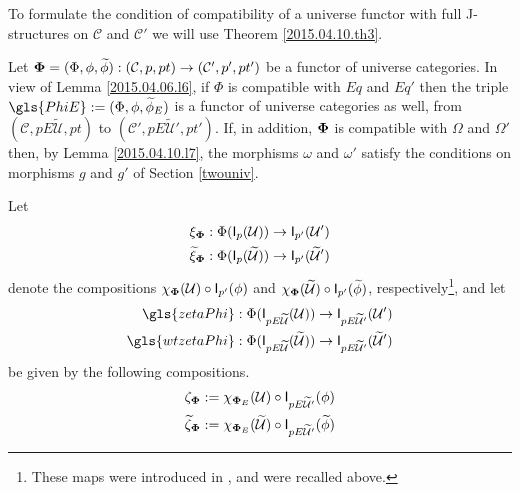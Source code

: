 \documentclass[12pt]{article}
\numberwithin{equation}{section}
\newcommand{\sr}{\rightarrow}
\newcommand{\wt}{\widetilde}
\newcommand{\C}{{\mathcal C}}  %
\newcommand{\U}{\mathcal{U}}
\newcommand{\I}{\mathsf{I}}
\begin{document}
To formulate the condition of compatibility of a universe functor with full
J-structures on $\C$ and $\C'$ we will use Theorem
\ref{2015.04.10.th3}.

Let ${\bf\Phi}=(\Phi,\phi,\wt{\phi}) : (\C,p,pt) \to (\C',p',pt')$ be a functor of universe categories. In
view of Lemma \ref{2015.04.06.l6}, if $\Phi$ is compatible with $Eq$ and $Eq'$
then the triple $\gls{PhiE}:=(\Phi,\phi,\wt{\phi}_{E})$ is a functor of
universe categories as well, from $(\C,pE\wt{\U},pt)$ to $(\C',pE\wt{\U}',pt')$.  If, in addition, ${\bf\Phi}$ is compatible with
$\Omega$ and $\Omega'$ then, by Lemma \ref{2015.04.10.l7}, the morphisms $\omega$
and $\omega'$ satisfy the conditions on morphisms $g$ and $g'$ of Section
\ref{twouniv}.

Let
%
\begin{align*}
  \xi_{\bf\Phi}&:\Phi(\I_p(\U))\sr \I_{p'}(\U') \\
  \wt{\xi}_{\bf\Phi}&:\Phi(\I_p(\wt{\U}))\sr \I_{p'}(\wt{\U}')
\end{align*}
%
denote the compositions $\chi_{\bf\Phi}(\U)\circ \I_{p'}(\phi)$ and
$\chi_{\bf\Phi}(\wt{\U})\circ \I_{p'}(\wt{\phi})$, respectively\footnote{These maps were introduced in \cite[\S 6]{fromunivwithPi}, and were recalled above.}, and let
%
\begin{align*}
  \gls{zetaPhi}   &: \Phi(\I_{pE\wt{\U}}(\U))\sr \I_{pE\wt{\U}'}(\U') \\
  \gls{wtzetaPhi} &: \Phi(\I_{pE\wt{\U}}(\wt{\U}))\sr \I_{pE\wt{\U}'}(\wt{\U}')
\end{align*}
%
be given by the following compositions.
\begin{align}
  \zeta_{\bf\Phi}      & := \chi_{{\bf\Phi}_{E}}(\U)\circ \I_{pE\wt{\U}'}(\phi) \label{zeta-Phi-defn} \\
  \wt{\zeta}_{\bf\Phi} & := \chi_{{\bf\Phi}_{E}}(\wt{\U})\circ \I_{pE\wt{\U}'}(\wt{\phi}) \label{wt-zeta-Phi-defn}
\end{align}
\end{document}
